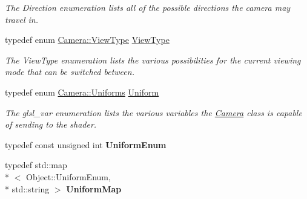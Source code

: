 \begin{DoxyCompactItemize}
\begin{DoxyCompactList}\small\item\em The Direction enumeration lists all of the possible directions the camera may travel in. \end{DoxyCompactList}\item 
typedef enum \hyperlink{class_camera_aaa256acd50a2fa143d9f8d9456e2802f}{Camera\-::\-View\-Type} \hyperlink{class_camera_a5b2dc5eaed6cbaabee0eea3f2714acd7}{View\-Type}
\begin{DoxyCompactList}\small\item\em The View\-Type enumeration lists the various possibilities for the current viewing mode that can be switched between. \end{DoxyCompactList}\item 
typedef enum \hyperlink{class_camera_a630738fd23098d44c0d15ee28d5649dd}{Camera\-::\-Uniforms} \hyperlink{class_camera_a0ed19c96505cbb70625938d1e883af24}{Uniform}
\begin{DoxyCompactList}\small\item\em The glsl\-\_\-var enumeration lists the various variables the \hyperlink{class_camera}{Camera} class is capable of sending to the shader. \end{DoxyCompactList}\item 
\hypertarget{class_object_a79b74057dbc5182b85c9c3ba8480fcf2}{typedef const unsigned int {\bfseries Uniform\-Enum}}\label{class_object_a79b74057dbc5182b85c9c3ba8480fcf2}

\item 
\hypertarget{class_object_a6e19bd8516360bff956408cbae33b878}{typedef std\-::map\\*
$<$ Object\-::\-Uniform\-Enum, \\*
std\-::string $>$ {\bfseries Uniform\-Map}}\label{class_object_a6e19bd8516360bff956408cbae33b878}

\end{DoxyCompactItemize}
